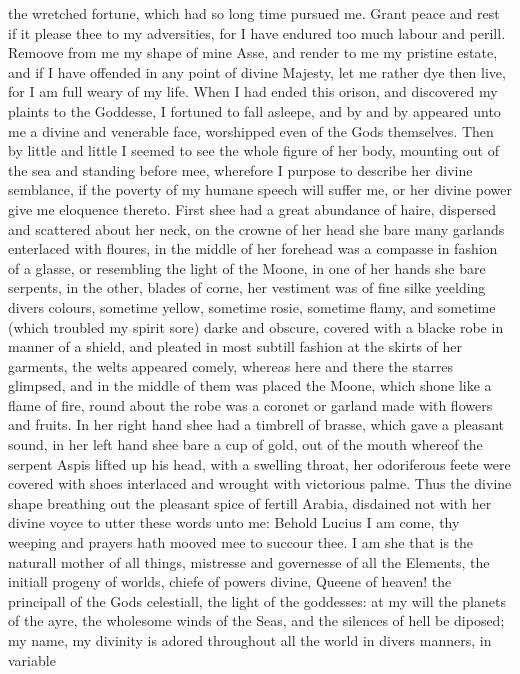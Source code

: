the wretched fortune, which had so long time pursued me. Grant peace and rest
if it please thee to my adversities, for I have endured too much labour and
perill. Remoove from me my shape of mine Asse, and render to me my pristine
estate, and if I have offended in any point of divine Majesty, let me rather
dye then live, for I am full weary of my life. When I had ended this orison,
and discovered my plaints to the Goddesse, I fortuned to fall asleepe, and by
and by appeared unto me a divine and venerable face, worshipped even of the
Gods themselves. Then by little and little I seemed to see the whole figure of
her body, mounting out of the sea and standing before mee, wherefore I purpose
to describe her divine semblance, if the poverty of my humane speech will
suffer me, or her divine power give me eloquence thereto. First shee had a
great abundance of haire, dispersed and scattered about her neck, on the crowne
of her head she bare many garlands enterlaced with floures, in the middle of
her forehead was a compasse in fashion of a glasse, or resembling the light of
the Moone, in one of her hands she bare serpents, in the other, blades of
corne, her vestiment was of fine silke yeelding divers colours, sometime
yellow, sometime rosie, sometime flamy, and sometime (which troubled my spirit
sore) darke and obscure, covered with a blacke robe in manner of a shield, and
pleated in most subtill fashion at the skirts of her garments, the welts
appeared comely, whereas here and there the starres glimpsed, and in the middle
of them was placed the Moone, which shone like a flame of fire, round about the
robe was a coronet or garland made with flowers and fruits. In her right hand
shee had a timbrell of brasse, which gave a pleasant sound, in her left hand
shee bare a cup of gold, out of the mouth whereof the serpent Aspis lifted up
his head, with a swelling throat, her odoriferous feete were covered with shoes
interlaced and wrought with victorious palme. Thus the divine shape breathing
out the pleasant spice of fertill Arabia, disdained not with her divine voyce
to utter these words unto me: Behold Lucius I am come, thy weeping and prayers
hath mooved mee to succour thee. I am she that is the naturall mother of all
things, mistresse and governesse of all the Elements, the initiall progeny of
worlds, chiefe of powers divine, Queene of heaven! the principall of the Gods
celestiall, the light of the goddesses: at my will the planets of the ayre, the
wholesome winds of the Seas, and the silences of hell be diposed; my name, my
divinity is adored throughout all the world in divers manners, in variable
